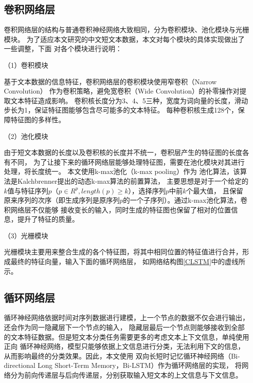 \subsection{卷积网络层}
卷积网络层的结构与普通卷积神经网络大致相同，分为卷积模块、池化模块与光栅模块。
为了适应本文研究的中文短文本数据，本文对每个模块的具体实现做出了一些调整，下面
对各个模块进行说明：

（1）卷积模块

基于文本数据的信息特征，卷积网络层的卷积模块使用窄卷积（Narrow Convolution）
作为卷积策略，避免宽卷积（Wide Convolution）的补零操作对提取文本特征造成影响。
卷积核长度分为3、4、5三种，宽度为词向量的长度，滑动步长为1，保证特征图能够包含尽可能多的文本特征。
每种卷积核生成128个，保障特征图的多样性。

（2）池化模块

由于短文本数据的长度以及卷积核的长度并不统一，卷积层产生的特征图的长度各有不同，
为了让接下来的循环网络层能够处理特征图，需要在池化模块对其进行处理，将长度统一。
本文使用k-max池化（k-max pooling）作为
池化算法，该算法是Kalchbrenner提出的动态k-max算法的前置算法，
主要思想是对于一个给定的$k$值与特征序列$p$（$p\in R^p,length(p)\geq k$），选择序列$p$中前$k$个最大值，
且保留原来序列的次序（即生成序列是原序列$p$的一个子序列）。通过k-max池化算法，卷积网络层不仅能够
接收变长的输入，同时生成的特征图也保留了相对的位置信息，提升了特征的质量。

（3）光栅模块

光栅模块主要用来整合生成的各个特征图，将其中相同位置的特征值进行合并，形成最终的特征向量，输入下面的循环网络层，
如网络结构图\ref{CLSTM}中的虚线所示。

\subsection{循环网络层}

循环神经网络依据时间对序列数据进行建模，上一个节点的数据不仅会进行输出，还会作为同一隐藏层下一个节点的输入，
隐藏层最后一个节点则能够接收到全部的文本特征数据。但是短文本分类任务需要更多的考虑文本上下文信息，单纯使用正向
循环神经网络，模型只能够依据上文信息进行分类，无法利用下文的信息，从而影响最终的分类效果。因此，本文使用
双向长短时记忆循环神经网络（Bi-directional Long Short-Term Memory，Bi-LSTM）作为循环网络层的实现，
将网络分为前向传递层与后向传递层，分别获取输入短文本的上文信息与下文信息。

